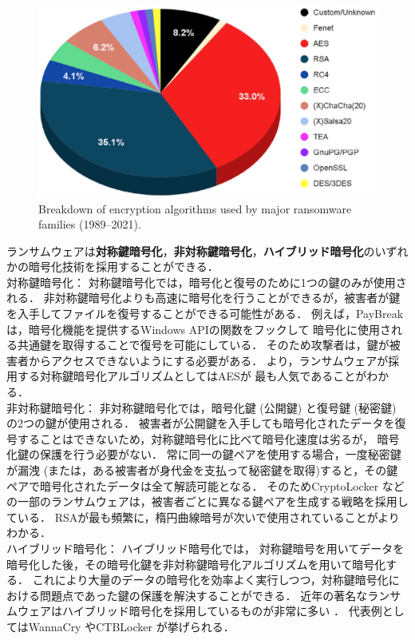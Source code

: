 \begin{figure}[tb]
  \begin{center}
    \includegraphics[width=\columnwidth]{./doc/img/encrypt_algo.eps}
  \end{center}
  \caption{Breakdown of encryption algorithms used by major ransomware families (1989–2021). \cite{begovic2023cryptographic}}
  \label{fig:encrypt_algo}
\end{figure}

ランサムウェアは\textbf{対称鍵暗号化}，\textbf{非対称鍵暗号化}，\textbf{ハイブリッド暗号化}のいずれかの暗号化技術を採用することができる．
\\
対称鍵暗号化：
対称鍵暗号化では，暗号化と復号のために1つの鍵のみが使用される．
非対称鍵暗号化よりも高速に暗号化を行うことができるが，被害者が鍵を入手してファイルを復号することができる可能性がある．
例えば，PayBreak \cite{kolodenker2017paybreak} は，暗号化機能を提供するWindows APIの関数をフックして
暗号化に使用される共通鍵を取得することで復号を可能にしている．
そのため攻撃者は，鍵が被害者からアクセスできないようにする必要がある．
より，ランサムウェアが採用する対称鍵暗号化アルゴリズムとしてはAESが
最も人気であることがわかる．
\\
非対称鍵暗号化：
非対称鍵暗号化では，暗号化鍵 (公開鍵) と復号鍵 (秘密鍵) の2つの鍵が使用される．
被害者が公開鍵を入手しても暗号化されたデータを復号することはできないため，対称鍵暗号化に比べて暗号化速度は劣るが，
暗号化鍵の保護を行う必要がない．
常に同一の鍵ペアを使用する場合，一度秘密鍵が漏洩 (または，ある被害者が身代金を支払って秘密鍵を取得)すると，その鍵ペアで暗号化されたデータは全て解読可能となる．
そのためCryptoLocker \cite{liao2016behind}などの一部のランサムウェアは，被害者ごとに異なる鍵ペアを生成する戦略を採用している．
RSAが最も頻繁に，楕円曲線暗号が次いで使用されていることがよりわかる．
\\
ハイブリッド暗号化：
ハイブリッド暗号化では，
対称鍵暗号を用いてデータを暗号化した後，その暗号化鍵を非対称鍵暗号化アルゴリズムを用いて暗号化する．
これにより大量のデータの暗号化を効率よく実行しつつ，対称鍵暗号化における問題点であった鍵の保護を解決することができる．
近年の著名なランサムウェアはハイブリッド暗号化を採用しているものが非常に多い \cite{begovic2023cryptographic}．
代表例としてはWannaCry \cite{WannaCry} やCTBLocker \cite{ctb-locker} が挙げられる．

